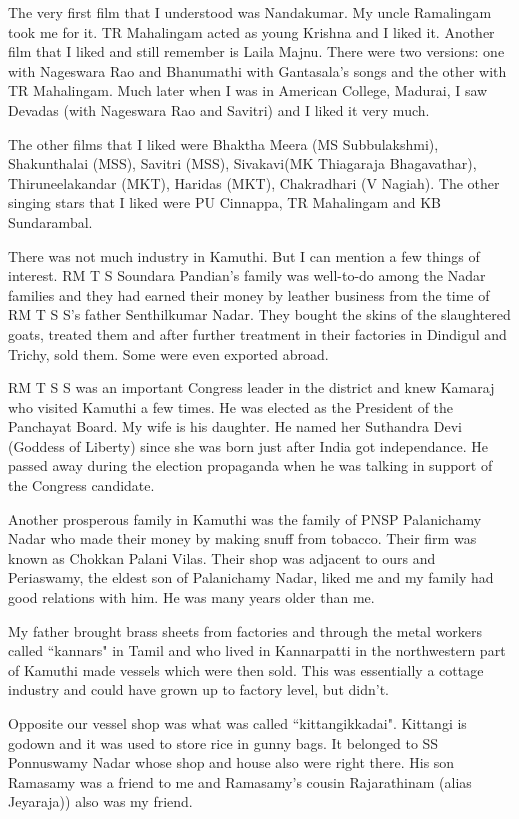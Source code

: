 The very first film that I understood was Nandakumar. My uncle 
Ramalingam took me for it. TR Mahalingam acted as young Krishna and I 
liked it. Another film that I liked and still remember is Laila Majnu. 
There were two versions: one with Nageswara Rao and Bhanumathi with 
Gantasala's songs and the other with TR Mahalingam. Much later when I 
was in American College, Madurai, I saw Devadas (with Nageswara Rao and 
Savitri) and I liked it very much.

The other films that I liked were Bhaktha Meera (MS Subbulakshmi), Shakunthalai (MSS), Savitri (MSS), Sivakavi\break (MK Thiagaraja Bhagavathar), Thiruneelakandar (MKT), Haridas (MKT), Chakradhari (V Nagiah). The other singing stars that I liked were PU Cinnappa, TR Mahalingam and KB Sunda\-rambal.

There was not much industry in Kamuthi. But I can mention a few things 
of interest. RM T S Soundara Pandian's family was well-to-do among the 
Nadar families and they had earned their money by leather business from 
the time of RM T S S's father Senthilkumar Nadar. They bought the skins 
of the slaughtered goats, treated them and after further treatment in 
their factories in Dindigul and Trichy, sold them. Some were even 
exported abroad.

RM T S S was an important Congress leader in the district and knew 
Kamaraj who visited Kamuthi a few times. He was elected as the President 
of the Panchayat Board. My wife is his daughter. He named her Suthandra 
Devi (Goddess of Liberty) since she was born just after India got 
independance. He passed away during the election propaganda when he was 
talking in support of the Congress candidate.

Another prosperous family in Kamuthi was the family of PNSP Palanichamy 
Nadar who made their money by making snuff from tobacco. Their firm was 
known as Chokkan Palani Vilas. Their shop was adjacent to ours and 
Periaswamy, the eldest son of Palanichamy Nadar, liked me and my family 
had good relations with him. He was many years older than me.

My father brought brass sheets from factories and through the metal 
workers called ``kannars" in Tamil and who lived in Kannarpatti in the 
northwestern part of Kamuthi made vessels which were then sold. This was 
essentially a cottage industry and could have grown up to factory level, 
but didn't.

Opposite our vessel shop was what was called ``kittangikkadai". Kittangi 
is godown and it was used to store rice in gunny bags. It belonged to SS 
Ponnuswamy Nadar whose shop and house also were right there. His son 
Ramasamy was a friend to me and Ramasamy's cousin Rajarathinam (alias 
Jeyaraja)) also was my friend.

